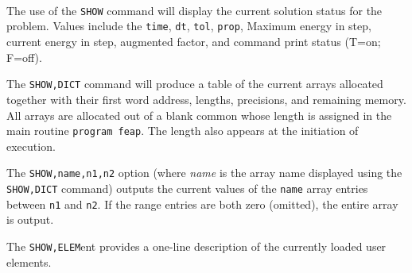  \\{\smallskip}
 \\{\smallskip}
 \\{\smallskip}
\headb

The use of the {\tt SHOW} command will display the current
solution status for the problem.  Values include the {\tt time},
{\tt dt}, {\tt tol}, {\tt prop}, Maximum energy in step, current energy
in step, augmented factor, and command print status
(T=on; F=off).

The {\tt SHOW,DICT} command will produce a table of the
current arrays allocated together with their first word
address, lengths, precisions, and remaining memory.  All
arrays are allocated out of a blank common whose length is
assigned in the main routine {\tt program feap}.  The length
also appears at the initiation of execution.

The {\tt SHOW,name,n1,n2} option (where {\it name} is the array name
displayed using the {\tt SHOW,DICT} command) outputs the current
values of the {\tt name} array entries between {\tt n1} and {\tt n2}.
If the range entries are both zero (omitted), the entire array is
output.

The {\tt SHOW,ELEM}ent provides a one-line description of the
currently loaded user elements.
\vfill\eject
